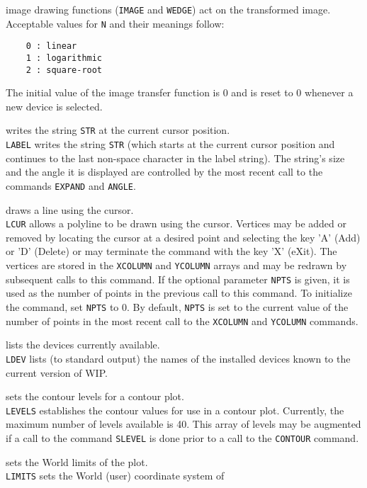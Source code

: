 	image drawing functions ({\tt IMAGE} and
	{\tt WEDGE}) act on the transformed image.
	Acceptable values for {\tt N} and their meanings follow:
	\begin{verbatim}
    0 : linear
    1 : logarithmic
    2 : square-root
	\end{verbatim}
	The initial value of the image transfer function is 0 and is
	reset to 0 whenever a new device is selected.
\item [{\tt LABEL STR } --] writes the string {\tt STR} at the current cursor position.\\
	{\tt LABEL} writes the string {\tt STR} (which
	starts at the current cursor position and continues to the
	last non-space character in the label string).  The string's 
	size and the angle it is displayed are controlled by the most
	recent call to the commands {\tt EXPAND}
	and {\tt ANGLE}.
\item [{\tt LCUR [NPTS] } --] draws a line using the cursor.\\
	{\tt LCUR} allows a polyline to be drawn using the cursor.
	Vertices may be added or removed by locating the cursor at a
	desired point and selecting the key 'A' (Add) or 'D' (Delete) or
	may terminate the command with the key 'X' (eXit).  The vertices
	are stored in the {\tt XCOLUMN} and
	{\tt YCOLUMN} arrays and may be
	redrawn by subsequent calls to this command.  If the optional
	parameter {\tt NPTS} is given, it is used as the number
	of points in the previous call to this command.  To initialize
	the command, set {\tt NPTS} to 0.  By default,
	{\tt NPTS} is set to the current value of the number of
	points in the most recent call to the
	{\tt XCOLUMN} and
	{\tt YCOLUMN} commands.
\item [{\tt LDEV } --] lists the devices currently available.\\
	{\tt LDEV} lists (to standard output) the names of
	the installed devices known to the current version of WIP.
\item [{\tt LEVELS [L1 L2 \dots] } --] sets the contour levels for a contour plot.\\
	{\tt LEVELS} establishes the contour values for use in a
	contour plot.  Currently, the maximum number of levels available
	is 40.  This array of levels may be augmented if a call to the
	command {\tt SLEVEL} is done prior to
	a call to the {\tt CONTOUR} command.
\item [{\tt LIMITS [X1 X2 Y1 Y2] } --] sets the World limits of the plot.\\
	{\tt LIMITS} sets the World (user) coordinate system of
